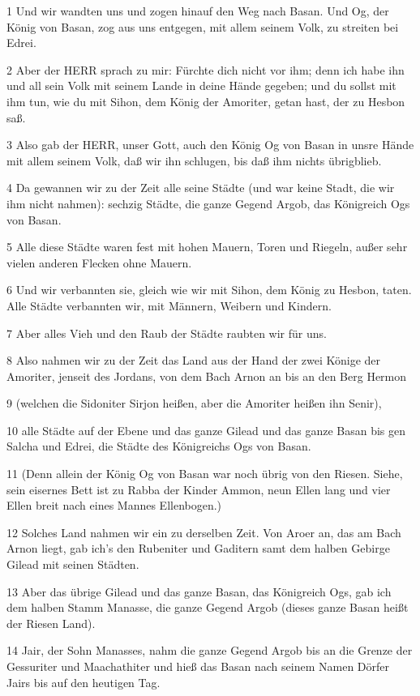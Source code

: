 \par 1 Und wir wandten uns und zogen hinauf den Weg nach Basan. Und Og, der König von Basan, zog aus uns entgegen, mit allem seinem Volk, zu streiten bei Edrei.
\par 2 Aber der HERR sprach zu mir: Fürchte dich nicht vor ihm; denn ich habe ihn und all sein Volk mit seinem Lande in deine Hände gegeben; und du sollst mit ihm tun, wie du mit Sihon, dem König der Amoriter, getan hast, der zu Hesbon saß.
\par 3 Also gab der HERR, unser Gott, auch den König Og von Basan in unsre Hände mit allem seinem Volk, daß wir ihn schlugen, bis daß ihm nichts übrigblieb.
\par 4 Da gewannen wir zu der Zeit alle seine Städte (und war keine Stadt, die wir ihm nicht nahmen): sechzig Städte, die ganze Gegend Argob, das Königreich Ogs von Basan.
\par 5 Alle diese Städte waren fest mit hohen Mauern, Toren und Riegeln, außer sehr vielen anderen Flecken ohne Mauern.
\par 6 Und wir verbannten sie, gleich wie wir mit Sihon, dem König zu Hesbon, taten. Alle Städte verbannten wir, mit Männern, Weibern und Kindern.
\par 7 Aber alles Vieh und den Raub der Städte raubten wir für uns.
\par 8 Also nahmen wir zu der Zeit das Land aus der Hand der zwei Könige der Amoriter, jenseit des Jordans, von dem Bach Arnon an bis an den Berg Hermon
\par 9 (welchen die Sidoniter Sirjon heißen, aber die Amoriter heißen ihn Senir),
\par 10 alle Städte auf der Ebene und das ganze Gilead und das ganze Basan bis gen Salcha und Edrei, die Städte des Königreichs Ogs von Basan.
\par 11 (Denn allein der König Og von Basan war noch übrig von den Riesen. Siehe, sein eisernes Bett ist zu Rabba der Kinder Ammon, neun Ellen lang und vier Ellen breit nach eines Mannes Ellenbogen.)
\par 12 Solches Land nahmen wir ein zu derselben Zeit. Von Aroer an, das am Bach Arnon liegt, gab ich's den Rubeniter und Gaditern samt dem halben Gebirge Gilead mit seinen Städten.
\par 13 Aber das übrige Gilead und das ganze Basan, das Königreich Ogs, gab ich dem halben Stamm Manasse, die ganze Gegend Argob (dieses ganze Basan heißt der Riesen Land).
\par 14 Jair, der Sohn Manasses, nahm die ganze Gegend Argob bis an die Grenze der Gessuriter und Maachathiter und hieß das Basan nach seinem Namen Dörfer Jairs bis auf den heutigen Tag.
